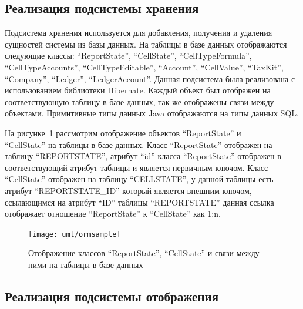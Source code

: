 \documentclass[14pt,a4paper]{reportmod}
\begin{document}
\subsection{Реализация подсистемы хранения}

Подсистема хранения используется для добавления, получения и удаления сущностей системы из базы данных. На таблицы в базе данных отображаются следующие классы: ``ReportState'', ``CellState'', ``CellTypeFormula'',\\``CellTypeAccounts'', ``CellTypeEditable'', ``Account'', ``CellValue'', ``TaxKit'',\\``Company'', ``Ledger'', ``LedgerAccount''. Данная подсистема была реализована с использованием библиотеки Hibernate. Каждый объект был отображен на соответствующую таблицу в базе данных, так же отображены связи между объектами. Примитивные типы данных Java отображаются на типы данных SQL.

На рисунке~\ref{pic:ormsample} рассмотрим отображение объектов ``ReportState'' и\\ ``CellState'' на таблицы в базе данных. Класс ``ReportState'' отображен на таблицу ``REPORTSTATE'', атрибут ``id'' класса ``ReportState'' отображен в соответствующий атрибут таблицы и является первичным ключом. Класс ``CellState'' отображен на таблицу ``CELLSTATE'', у данной таблицы есть атрибут ``REPORTSTATE\_ID'' который является внешним ключом, ссылающимся на атрибут ``ID'' таблицы ``REPORTSTATE'' данная ссылка отображает отношение ``ReportState'' к ``CellState'' как 1:n.

\begin{figure}
  \centering
  \texttt{[image: uml/ormsample]}
  \caption{Отображение классов ``ReportState'', ``CellState'' и связи между ними на таблицы в базе данных}
  \label{pic:ormsample}
\end{figure}


\subsection{Реализация подсистемы отображения}
\end{document}
